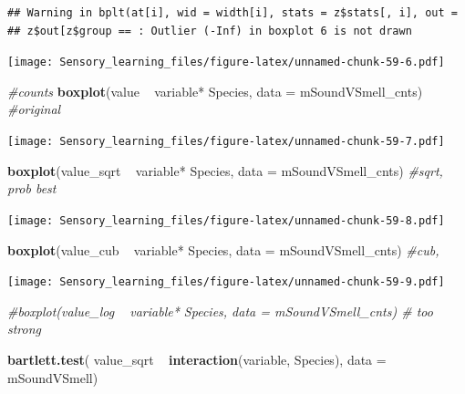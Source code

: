 \documentclass[]{article}
\newenvironment{Shaded}{\begin{snugshade}}{\end{snugshade}}
\newcommand{\KeywordTok}[1]{\textcolor[rgb]{0.13,0.29,0.53}{\textbf{{#1}}}}
\newcommand{\DataTypeTok}[1]{\textcolor[rgb]{0.13,0.29,0.53}{{#1}}}
\newcommand{\StringTok}[1]{\textcolor[rgb]{0.31,0.60,0.02}{{#1}}}
\newcommand{\CommentTok}[1]{\textcolor[rgb]{0.56,0.35,0.01}{\textit{{#1}}}}
\newcommand{\NormalTok}[1]{{#1}}
\begin{document}
\begin{verbatim}
## Warning in bplt(at[i], wid = width[i], stats = z$stats[, i], out =
## z$out[z$group == : Outlier (-Inf) in boxplot 6 is not drawn
\end{verbatim}

\texttt{[image: Sensory\_learning\_files/figure-latex/unnamed-chunk-59-6.pdf]}

\begin{Shaded}
\begin{Highlighting}[]
\CommentTok{#counts}
\KeywordTok{boxplot}\NormalTok{(value ~}\StringTok{  }\NormalTok{variable*}\StringTok{ }\NormalTok{Species, }\DataTypeTok{data =} \NormalTok{mSoundVSmell_cnts) }\CommentTok{#original}
\end{Highlighting}
\end{Shaded}

\texttt{[image: Sensory\_learning\_files/figure-latex/unnamed-chunk-59-7.pdf]}

\begin{Shaded}
\begin{Highlighting}[]
\KeywordTok{boxplot}\NormalTok{(value_sqrt ~}\StringTok{  }\NormalTok{variable*}\StringTok{ }\NormalTok{Species, }\DataTypeTok{data =} \NormalTok{mSoundVSmell_cnts) }\CommentTok{#sqrt, prob best}
\end{Highlighting}
\end{Shaded}

\texttt{[image: Sensory\_learning\_files/figure-latex/unnamed-chunk-59-8.pdf]}

\begin{Shaded}
\begin{Highlighting}[]
\KeywordTok{boxplot}\NormalTok{(value_cub ~}\StringTok{  }\NormalTok{variable*}\StringTok{ }\NormalTok{Species, }\DataTypeTok{data =} \NormalTok{mSoundVSmell_cnts) }\CommentTok{#cub, }
\end{Highlighting}
\end{Shaded}

\texttt{[image: Sensory\_learning\_files/figure-latex/unnamed-chunk-59-9.pdf]}

\begin{Shaded}
\begin{Highlighting}[]
\CommentTok{#boxplot(value_log ~  variable* Species, data = mSoundVSmell_cnts) # too strong}

\KeywordTok{bartlett.test}\NormalTok{( value_sqrt ~}\StringTok{  }\KeywordTok{interaction}\NormalTok{(variable, Species), }\DataTypeTok{data =} \NormalTok{mSoundVSmell)}
\end{Highlighting}
\end{Shaded}
\end{document}
